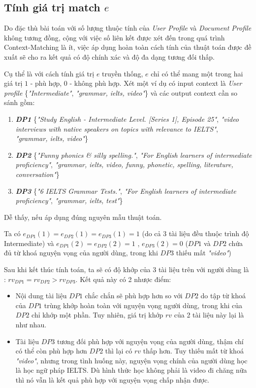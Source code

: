 \subsection{Tính giá trị match $e$}

Do đặc thù bài toán với số lượng thuộc tính của \textit{User Profile} và \textit{Document Profile} không tương đồng, cộng với việc số liên kết được xét đến trong quá trình Context-Matching là ít, việc áp dụng hoàn toàn cách tính của thuật toán được đề xuất sẽ cho ra kết quả có độ chính xác và độ đa dạng tương đối thấp. 

Cụ thể là với cách tính giá trị $e$ truyền thống, $e$ chỉ có thể mang một trong hai giá trị $1$ - phù hợp, $0$ - không phù hợp. Xét một ví dụ có input context là \textit{User profile} \{\textit{"Intermediate"}, \textit{"grammar, ielts, video"}\} và các output context cần so sánh gồm:

\begin{enumerate}
	\item \textit{\textbf{DP1}} \{\textit{"Study English - Intermediate Level. [Series 1], Episode 25"}, \textit{"video interviews with native speakers on topics with relevance to IELTS"},  \textit{"grammar, ielts, video"}\} 
	\item \textit{\textbf{DP2}} \{\textit{"Funny phonics \& silly spelling."}, \textit{"For English learners of intermediate proficiency"},  \textit{"grammar, ielts, video, funny, phonetic, spelling, literature, conversation"}\}
	\item \textit{\textbf{DP3}} \{\textit{"6 IELTS Grammar Tests."}, \textit{"For English learners of intermediate proficiency"},  \textit{"grammar, ielts, test"}\}
\end{enumerate} 

Dễ thấy, nếu áp dụng đúng nguyên mẫu thuật toán.

Ta có $e_{DP1}(1) = e_{DP2}(1) = e_{DP3}(1) = 1 $ (do cả 3 tài liệu đều thuộc trình độ Intermediate) và $e_{DP1}(2) = e_{DP2}(2) = 1 $ , $e_{DP3}(2) = 0$ ($DP1$ và $DP2$ chứa đủ từ khoá nguyện vọng của người dùng, trong khi $DP3$ thiếu mất \textit{"video"})
	  
Sau khi kết thúc tính toán, ta sẽ có độ khớp của 3 tài liệu trên với người dùng là : $rv_{DP1} = rv_{DP2} > rv_{DP3}$. Kết quả này có 2 nhược điểm:

\begin{itemize}
	\item Nội dung tài liệu $DP1$ chắc chắn sẽ phù hợp hơn so với $DP2$ do tập từ khoá của $DP1$ trùng khớp hoàn toàn với nguyện vọng người dùng, trong khi của $DP2$ chỉ khớp một phần. Tuy nhiên, giá trị khớp $rv$ của 2 tài liệu này lại là như nhau.
	\item Tài liệu $DP3$ tương đối phù hợp với nguyện vọng của người dùng, thậm chí có thể còn phù hợp hơn $DP2$ thì lại có $rv$ thấp hơn. Tuy thiếu mất từ khoá \textit{"video"}, nhưng trong tình huống này, nguyện vọng chính của người dùng học là học ngữ pháp IELTS. Dù hình thức học không phải là video đi chăng nữa thì nó vẫn là kết quả phù hợp với nguyện vọng chấp nhận được.
\end{itemize}

